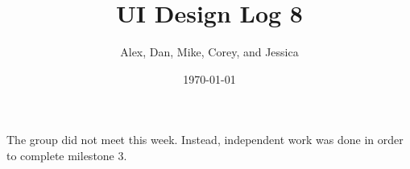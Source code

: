 \documentclass{article}
\title{UI Design Log 8}
\author{Alex, Dan, Mike, Corey, and Jessica}
\date{\today}
\begin{document}
\maketitle
The group did not meet this week.
Instead, independent work was done in order to complete milestone 3.
\end{document}
